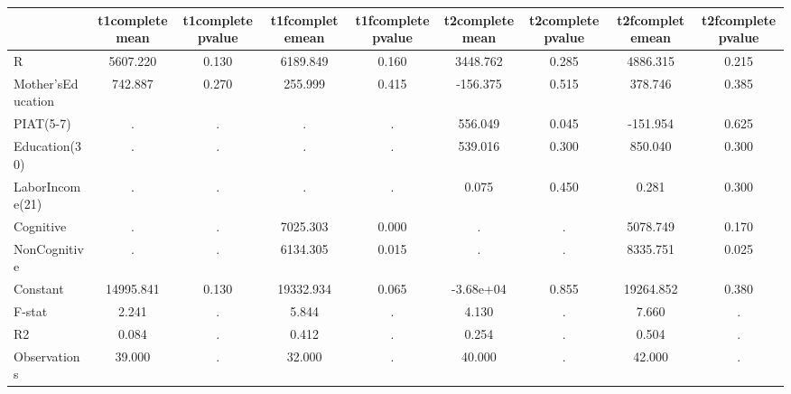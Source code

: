 \begin{table}[htbp]
\begin{tabular}{lcccccccc} \hline \hline
 & t1completemean  & t1completepvalue  & t1fcompletemean  & t1fcompletepvalue  & t2completemean  & t2completepvalue  & t2fcompletemean  & t2fcompletepvalue  \\  \hline 
R &  5607.220 &     0.130 &  6189.849 &     0.160 &  3448.762 &     0.285 &  4886.315 &     0.215 \\  
Mother'sEducation &   742.887 &     0.270 &   255.999 &     0.415 &  -156.375 &     0.515 &   378.746 &     0.385 \\  
PIAT(5-7) &         . &         . &         . &         . &   556.049 &     0.045 &  -151.954 &     0.625 \\  
Education(30) &         . &         . &         . &         . &   539.016 &     0.300 &   850.040 &     0.300 \\  
LaborIncome(21) &         . &         . &         . &         . &     0.075 &     0.450 &     0.281 &     0.300 \\  
Cognitive &         . &         . &  7025.303 &     0.000 &         . &         . &  5078.749 &     0.170 \\  
NonCognitive &         . &         . &  6134.305 &     0.015 &         . &         . &  8335.751 &     0.025 \\  
Constant & 14995.841 &     0.130 & 19332.934 &     0.065 & -3.68e+04 &     0.855 & 19264.852 &     0.380 \\  
F-stat &     2.241 &         . &     5.844 &         . &     4.130 &         . &     7.660 &         . \\  
R2 &     0.084 &         . &     0.412 &         . &     0.254 &         . &     0.504 &         . \\  
Observations &    39.000 &         . &    32.000 &         . &    40.000 &         . &    42.000 &         . \\  
\hline \hline \end{tabular}
\end{table}
